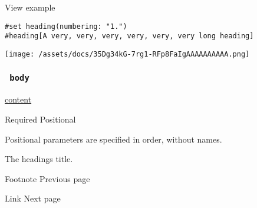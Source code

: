 
View example

\begin{verbatim}
#set heading(numbering: "1.")
#heading[A very, very, very, very, very, very long heading]
\end{verbatim}

\texttt{[image: /assets/docs/35Dg34kG-7rg1-RFp8FaIgAAAAAAAAAA.png]}

\subsubsection{\texorpdfstring{\texttt{\ body\ }}{ body }}\label{parameters-body}

\href{/docs/reference/foundations/content/}{content}

{Required} {{ Positional }}

\label{parameters-body-positional-tooltip}
Positional parameters are specified in order, without names.

The heading\textquotesingle s title.

\href{/docs/reference/model/footnote/}{\pandocbounded{}}

{ Footnote } { Previous page }

\href{/docs/reference/model/link/}{\pandocbounded{}}

{ Link } { Next page }
